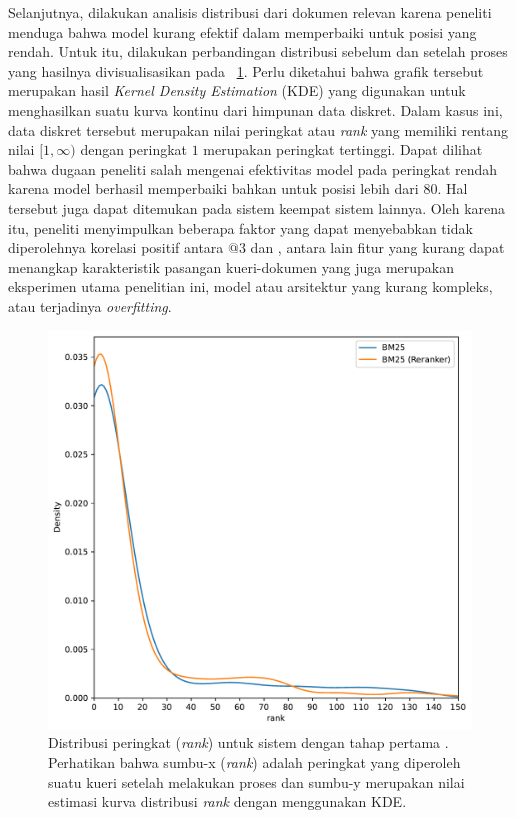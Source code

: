Selanjutnya, dilakukan analisis distribusi \ranking{} dari dokumen relevan karena peneliti menduga bahwa model \lambdamart{} kurang efektif dalam memperbaiki \ranking{} untuk posisi yang rendah. Untuk itu, dilakukan perbandingan distribusi sebelum dan setelah proses \reranking{} yang hasilnya divisualisasikan pada \gambar{}~\ref{grafik:dist rank}. Perlu diketahui bahwa grafik tersebut merupakan hasil \textit{Kernel Density Estimation} (KDE) yang digunakan untuk menghasilkan suatu kurva kontinu dari himpunan data diskret. Dalam kasus ini, data diskret tersebut merupakan nilai peringkat atau \textit{rank} yang memiliki rentang nilai $[1,\infty)$ dengan peringkat $1$ merupakan peringkat tertinggi. Dapat dilihat bahwa dugaan peneliti salah mengenai efektivitas model pada peringkat rendah karena model \lambdamart{} berhasil memperbaiki \ranking{} bahkan untuk posisi lebih dari $80$. Hal tersebut juga dapat ditemukan pada sistem keempat sistem lainnya. Oleh karena itu, peneliti menyimpulkan beberapa faktor yang dapat menyebabkan tidak diperolehnya korelasi positif antara \recall{}$@3$ dan \cutoff{}, antara lain fitur yang kurang dapat menangkap karakteristik pasangan kueri-dokumen yang juga merupakan eksperimen utama penelitian ini, model atau arsitektur yang kurang kompleks, atau terjadinya \textit{overfitting}.
\begin{figure}[!ht]
    \centering
    \includegraphics[scale=0.6]{assets/pdfs/Rank KDE BM25.pdf}
    \caption{Distribusi peringkat (\textit{rank}) untuk sistem dengan tahap \ranking{} pertama \obm{}. Perhatikan bahwa sumbu-x (\textit{rank}) adalah peringkat yang diperoleh suatu kueri setelah melakukan proses \retrieval{} dan sumbu-y merupakan nilai estimasi kurva distribusi \textit{rank} dengan menggunakan KDE.}
    \label{grafik:dist rank}
\end{figure}





